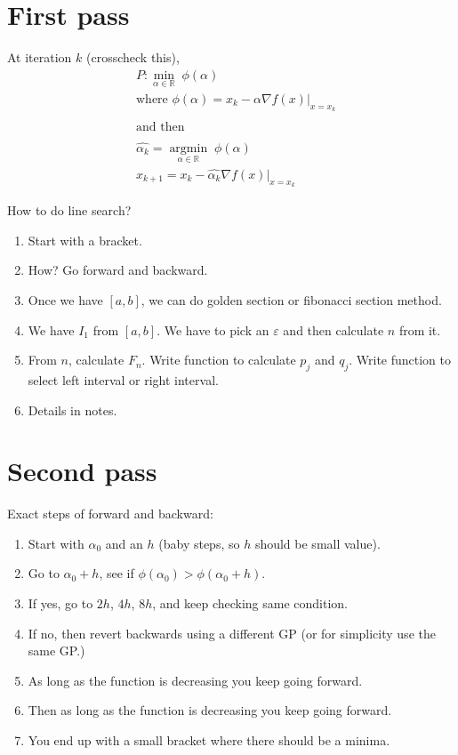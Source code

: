 \documentclass[11pt]{article}
\author{Mridul Gupta}
\date{\today}
\title{}
\begin{document}
\section{First pass}

At iteration \(k\) (crosscheck this),
\begin{align*}
    &P:\min_{\alpha\in\mathbb{R}}\;\phi(\alpha)\\
    &\mbox{where }\phi(\alpha)=x_k-\alpha\nabla f(x)\lvert_{x=x_k}\\
    &\\
    &\mbox{and then}\\
    &\\
    &\hat{\alpha_k}=\underset{\alpha\in\mathbb{R}}{\operatorname{argmin}}\;\phi(\alpha)\\
    &x_{k+1}=x_k-\hat{\alpha_k}\nabla f(x)\lvert_{x=x_k}
\end{align*}
\vspace{1cm}

How to do line search?

\begin{enumerate}
    \item Start with a bracket.
    \item How? Go forward and backward.
    \item Once we have \([a,b]\), we can do golden section or fibonacci section method.
    \item We have \(I_1\) from \([a,b]\). We have to pick an \(\varepsilon\) and then calculate \(n\) from it.
    \item From \(n\), calculate \(F_n\). Write function to calculate \(p_j\) and \(q_j\). Write function to select left interval or right interval.
    \item Details in notes.
\end{enumerate}

\section{Second pass}

Exact steps of forward and backward:
\begin{enumerate}
    \item Start with \(\alpha_0\) and an \(h\) (baby steps, so \(h\) should be
        small value).
    \item Go to \(\alpha_0+h\), see if \(\phi(\alpha_0)>\phi(\alpha_0+h)\).
    \item If yes, go to \(2h\), \(4h\), \(8h\), and keep checking same condition.
    \item If no, then revert backwards using a different GP (or for simplicity
        use the same GP.)
    \item As long as the function is decreasing you keep going forward.
    \item Then as long as the function is decreasing you keep going forward.
    \item You end up with a small bracket where there should be a minima.
\end{enumerate}
\end{document}
